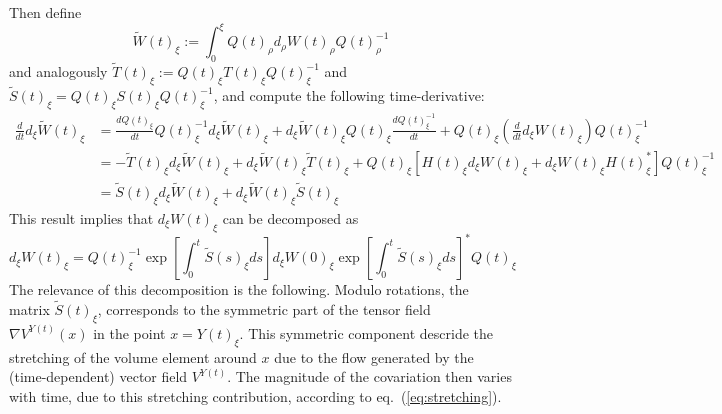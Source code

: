 \documentclass[a4paper,12pt,reqno]{amsart}
\begin{document}
Then define 
$$
\widetilde W(t)_{\xi} := \int_0^\xi Q(t)_\rho d_\rho W(t)_\rho Q(t)_\rho^{-1}
$$ 
and analogously $\widetilde
T(t)_\xi := Q(t)_\xi T(t)_\xi Q(t)_\xi^{-1}$ and $\widetilde S(t)_\xi
=  Q(t)_\xi S(t)_\xi Q(t)_\xi^{-1}$, and compute the following time-derivative:
\begin{equation*}
  \begin{split}
 \frac{d}{dt} d_\xi \widetilde W(t)_\xi & = \frac{dQ(t)_\xi}{dt} Q(t)_\xi^{-1}
 d_\xi \widetilde W(t)_\xi + d_\xi \widetilde W(t)_\xi Q(t)_\xi \frac{dQ(t)_\xi^{-1}}{dt} +
 Q(t)_\xi \left(\frac{d}{dt} d_\xi W(t)_\xi \right) Q(t)_\xi^{-1}  
\\ & = - \widetilde T(t)_\xi 
 d_\xi\widetilde W(t)_\xi + d_\xi\widetilde W(t)_\xi \widetilde T(t)_\xi+
 Q(t)_\xi [H(t)_\xi d_\xi W(t)_\xi +  d_\xi W(t)_\xi H(t)_\xi^* ] Q(t)_\xi^{-1}   
\\ & = \widetilde S(t)_\xi d_\xi \widetilde W(t)_\xi +
 d_\xi \widetilde W(t)_\xi \widetilde S(t)_\xi
  \end{split}
\end{equation*}
This result implies that $d_\xi W(t)_\xi$ can be decomposed as
\begin{equation}
  \label{eq:stretching}
d_\xi W(t)_\xi = Q(t)_\xi^{-1} \exp\left[\int_0^t \widetilde S(s)_\xi ds\right]
d_\xi W(0)_\xi
\exp\left[\int_0^t \widetilde S(s)_\xi ds\right]^* Q(t)_\xi  
\end{equation}
The relevance of this decomposition is the following. Modulo
rotations, the matrix $\widetilde S(t)_\xi$, corresponds to the
symmetric part of the tensor field $\nabla V^{Y(t)}(x)$ in the point
$x = Y(t)_\xi$. This symmetric component descride the stretching of
the  volume element around $x$ due to the flow generated by
the (time-dependent)  vector
field $V^{Y(t)}$. The magnitude of the covariation then varies
with time, due to this
 stretching contribution, according to eq.~(\ref{eq:stretching}).
   
\end{document}
